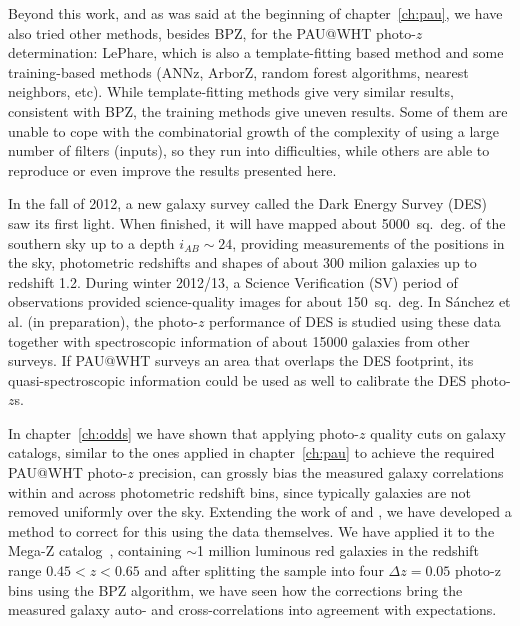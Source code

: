 Beyond this work, and as was said at the beginning of chapter~\ref{ch:pau}, we have also tried other methods, besides BPZ, for the PAU@WHT photo-$z$ determination: LePhare, which is also a template-fitting based method and some training-based methods (ANNz, ArborZ, random forest algorithms, nearest neighbors, etc). While template-fitting methods give very similar results, consistent with BPZ, the training methods give uneven results. Some of them are unable to cope with the combinatorial growth of the complexity of using a large number of filters (inputs), so they run into difficulties, while others are able to reproduce or even improve the results presented here. 

In the fall of 2012, a new galaxy survey called the Dark Energy Survey (DES) saw its first light. When finished, it will have mapped about 5000~sq.~deg. of the southern sky up to a depth $i_{AB} \sim 24$, providing measurements of the positions in the sky, photometric redshifts and shapes of about 300 milion galaxies up to redshift 1.2. During winter 2012/13, a Science Verification (SV) period of observations provided science-quality images for about 150~sq.~deg. In S\'anchez et al. (in preparation), the photo-$z$ performance of DES is studied using these data together with spectroscopic information of about 15000 galaxies from other surveys. If PAU@WHT surveys an area that overlaps the DES footprint, its quasi-spectroscopic information could be used as well to calibrate the DES photo-$z$s. 

In chapter~\ref{ch:odds} we have shown that applying photo-$z$ quality cuts on galaxy catalogs, similar to the ones applied in chapter~\ref{ch:pau} to achieve the required PAU@WHT photo-$z$ precision, can grossly bias the measured galaxy correlations within and across photometric redshift bins, since typically galaxies are not removed uniformly over the sky. Extending the work of \citet{Ho2012} and \citet{Ross2011}, we have developed a method to correct for this using the data themselves. We have applied it to the Mega-Z catalog~\citep{Collister2007}, containing $\sim$1 million luminous red galaxies in the redshift range $0.45<z<0.65$ and after splitting the sample into four $\Delta z = 0.05$ photo-z bins using the BPZ algorithm, we have seen how the corrections bring the measured galaxy auto- and cross-correlations into agreement with expectations. 

